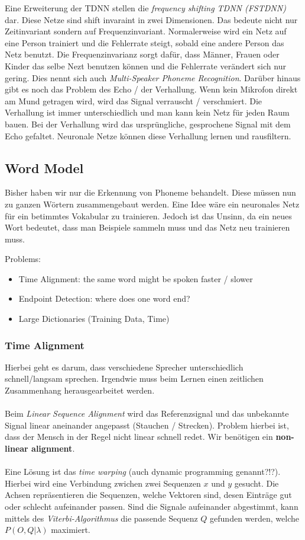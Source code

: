 Eine Erweiterung der TDNN stellen die \textit{frequency shifting TDNN (FSTDNN)} dar. Diese Netze sind shift invaraint in zwei Dimensionen. Das bedeute nicht nur Zeitinvariant sondern auf Frequenzinvariant. Normalerweise wird ein Netz auf eine Person trainiert und die Fehlerrate steigt, sobald eine andere Person das Netz benutzt. Die Frequenzinvarianz sorgt dafür, dass Männer, Frauen oder Kinder das selbe Nezt benutzen können und die Fehlerrate verändert sich nur gering. Dies nennt sich auch \textit{Multi-Speaker Phoneme Recognition}.
Darüber hinaus gibt es noch das Problem des Echo / der Verhallung. Wenn kein Mikrofon direkt am Mund getragen wird, wird das Signal verrauscht / verschmiert. Die Verhallung ist immer unterschiedlich und man kann kein Netz für jeden Raum bauen. Bei der Verhallung wird das ursprüngliche, gesprochene Signal mit dem Echo gefaltet. Neuronale Netze können diese Verhallung lernen und rausfiltern.
\subsection{Word Model}
\label{ssect:word-model}
Bisher haben wir nur die Erkennung von Phoneme behandelt. Diese müssen nun zu ganzen Wörtern zusammengebaut werden. Eine Idee wäre ein neuronales Netz für ein betimmtes Vokabular zu trainieren. Jedoch ist das Unsinn, da ein neues Wort bedeutet, dass man Beispiele sammeln muss und das Netz neu trainieren muss.

Problems:
\begin{itemize}
	\item Time Alignment: the same word might be spoken faster / slower
	\item Endpoint Detection: where does one word end?
	\item Large Dictionaries (Training Data, Time)
\end{itemize}

\subsubsection{Time Alignment}
\label{sssect:time-varying-patterns}
Hierbei geht es darum, dass verschiedene Sprecher unterschiedlich schnell/langsam sprechen. Irgendwie muss beim Lernen einen zeitlichen Zusammenhang herausgearbeitet werden. \\ \\
Beim \textit{Linear Sequence Alignment} wird das Referenzsignal und das unbekannte Signal linear aneinander angepasst (Stauchen / Strecken). Problem hierbei ist, dass der Mensch in der Regel nicht linear schnell redet. Wir benötigen ein \textbf{non-linear alignment}.\\ \\
Eine Lösung ist das \textit{time warping} (auch dynamic programming genannt?!?). Hierbei wird eine Verbindung zwichen zwei Sequenzen $x$ und $y$ gesucht. Die Achsen repräsentieren die Sequenzen, welche Vektoren sind, desen Einträge gut oder schlecht aufeinander passen.
Sind die Signale aufeinander abgestimmt, kann mittels des \textit{Viterbi-Algorithmus} die passende Sequenz $Q$ gefunden werden, welche $P(O, Q| \lambda)$ maximiert.


